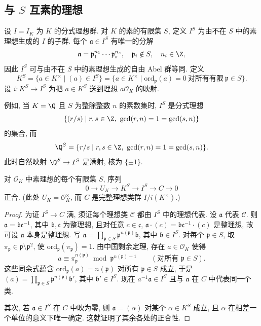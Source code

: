 \subsection*{与 $S$ 互素的理想}

设 $I=I_K$ 为 $K$ 的分式理想群. 对 $K$ 的素的有限集 $S$, 定义 $I^S$ 为由不在 $S$ 中的素理想生成的 $I$ 的子群. 每个 $\mathfrak{a}\in I^S$ 有唯一的分解
\[
\mathfrak{a}=\mathfrak{p}_1^{n_1}\cdots\mathfrak{p}_s^{n_s},\quad\mathfrak{p}_i\notin S,\quad n_i\in\Z,
\]
因此 $I^S$ 可与由不在 $S$ 中的素理想生成的自由 Abel 群等同. 定义
\[
K^S=\{a\in K^{\times}\mid(a)\in I^S\}=\{a\in K^{\times}\mid\mathrm{ord}_{\mathfrak{p}}(a)=0\ \text{对所有有限}\ \mathfrak{p}\in S\}.
\]
设 $i\colon K^S\to I^S$ 为把 $a\in K^S$ 送到理想 $a\mathcal{O}_K$ 的映射.

例如, 当 $K=\Q$ 且 $S$ 为整除整数 $n$ 的素数集时, $I^S$ 是分式理想
\[
\{(r/s)\mid r,s\in\Z,\ \gcd(r,n)=1=\gcd(s,n)\}
\]
的集合, 而
\[
\Q^S=\{r/s\mid r,s\in\Z,\ \gcd(r,n)=1=\gcd(s,n)\}.
\]
此时自然映射 $\Q^S\to I^S$ 是满射, 核为 $\{\pm1\}$.

\begin{lemma}\label{lem:v.1.1}
对 $\mathcal{O}_K$ 中素理想的每个有限集 $S$, 序列
\[
0\to U_K\to K^S\to I^S\to C\to0
\]
正合. (此处 $U_K=\mathcal{O}_K^{\times}$, 而 $C$ 是完整理想类群 $I/i(K^{\times})$.)
\end{lemma}

\begin{proof}
为证 $I^S\to C$ 满, 须证每个理想类 $\mathcal{C}$ 都由 $I^S$ 中的理想代表. 设 $\mathfrak{a}$ 代表 $\mathcal{C}$. 则 $\mathfrak{a}=\mathfrak{b}\mathfrak{c}^{-1}$, 其中 $\mathfrak{b},\mathfrak{c}$ 为整理想, 且对任意 $c\in\mathfrak{c}$, $\mathfrak{a}\cdot(c)=\mathfrak{b}\mathfrak{c}^{-1}\cdot(c)$ 是整理想, 故可设 $\mathfrak{a}$ 本身是整理想. 写 $\mathfrak{a}=\prod_{\mathfrak{p}\in S}\mathfrak{p}^{n(\mathfrak{p})}\mathfrak{b}$, 其中 $\mathfrak{b}\in I^S$. 对每个 $\mathfrak{p}\in S$, 取 $\pi_{\mathfrak{p}}\in\mathfrak{p}\setminus\mathfrak{p}^2$, 使 $\mathrm{ord}_{\mathfrak{p}}(\pi_{\mathfrak{p}})=1$. 由中国剩余定理, 存在 $a\in\mathcal{O}_K$ 使得
\[
a\equiv\pi_{\mathfrak{p}}^{n(\mathfrak{p})}\bmod\mathfrak{p}^{n(\mathfrak{p})+1}\qquad(\text{对所有 }\mathfrak{p}\in S).
\]
这些同余式蕴含 $\mathrm{ord}_{\mathfrak{p}}(a)=n(\mathfrak{p})$ 对所有 $\mathfrak{p}\in S$ 成立, 于是 $(a)=\prod_{\mathfrak{p}\in S}\mathfrak{p}^{n(\mathfrak{p})}\mathfrak{b}'$, 其中 $\mathfrak{b}'\in I^S$. 现在 $a^{-1}\mathfrak{a}\in I^S$ 且与 $\mathfrak{a}$ 在 $C$ 中代表同一个类.

其次, 若 $\mathfrak{a}\in I^S$ 在 $C$ 中映为零, 则 $\mathfrak{a}=(\alpha)$ 对某个 $\alpha\in K^S$ 成立, 且 $\alpha$ 在相差一个单位的意义下唯一确定. 这就证明了其余各处的正合性.
\end{proof}

